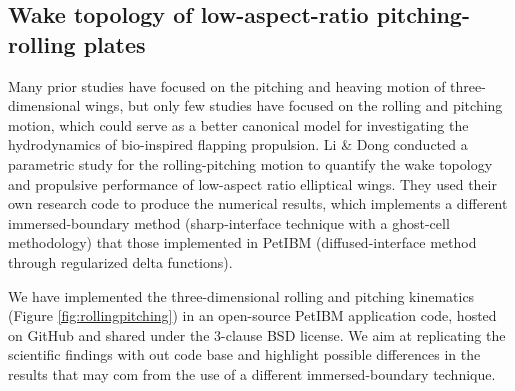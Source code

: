 \documentclass{parcfd}
\begin{document}
\subsection{Wake topology of low-aspect-ratio pitching-rolling plates}

Many prior studies have focused on the pitching and heaving motion of three-dimensional wings, but only few studies have focused on the rolling and pitching motion, which could serve as a better canonical model for investigating the hydrodynamics of bio-inspired flapping propulsion.
Li \& Dong \cite{li_dong_2016} conducted a parametric study for the rolling-pitching motion to quantify the wake topology and propulsive performance of low-aspect ratio elliptical wings.
They used their own research code to produce the numerical results, which implements a different immersed-boundary method (sharp-interface technique with a ghost-cell methodology) that those implemented in PetIBM (diffused-interface method through regularized delta functions).

We have implemented the three-dimensional rolling and pitching kinematics (Figure \ref{fig:rollingpitching}) in an open-source PetIBM application code, hosted on GitHub and shared under the 3-clause BSD license.
We aim at replicating the scientific findings with out code base and highlight possible differences in the results that may com from the use of a different immersed-boundary technique.
\end{document}

